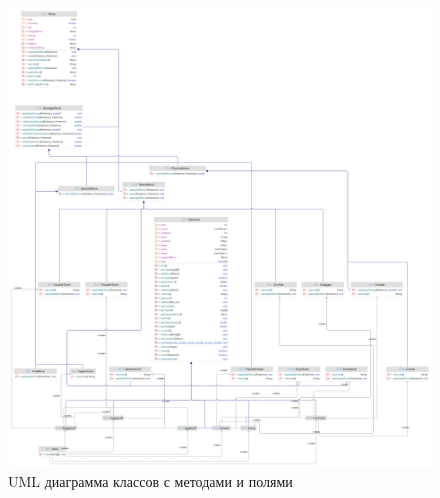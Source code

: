 
    \begin{figure}[H] %
        \centering
        \includegraphics[width=\textwidth]{res/UML-class-diagram.png}
        \caption{UML диаграмма классов с методами и полями}
        \label{fig:enter-label2}
    \end{figure}


